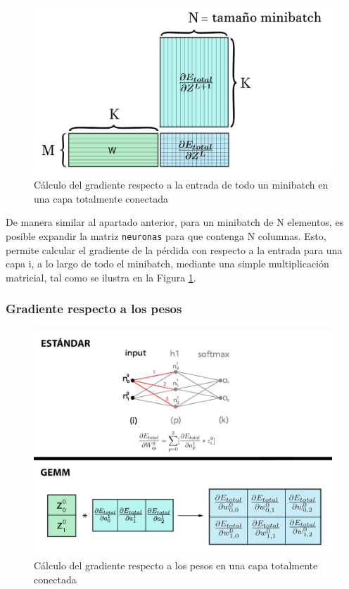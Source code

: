 \begin{figure}[H]
	\centering
	\includegraphics[scale=0.25]{imagenes/gemm_fully_back_input_minibatch.jpg}  
	\caption{Cálculo del gradiente respecto a la entrada de todo un minibatch en una capa totalmente conectada}
	\label{fig:gemm_fully_back_input_minibatch}
\end{figure}

De manera similar al apartado anterior, para un minibatch de N elementos, es posible expandir la matriz \texttt{neuronas} para que contenga N columnas. Esto, permite calcular el gradiente de la pérdida con respecto a la entrada para una capa i, a lo largo de todo el minibatch, mediante una simple multiplicación matricial, tal como se ilustra en la Figura \ref{fig:gemm_fully_back_input_minibatch}.

\subsubsection{Gradiente respecto a los pesos}
\begin{figure}[H]
	\centering
	\includegraphics[scale=0.3]{imagenes/gemm_fully_back_w.jpg}  
	\caption{Cálculo del gradiente respecto a los pesos en una capa totalmente conectada}
	\label{fig:gemm_fully_back_w}
\end{figure}


